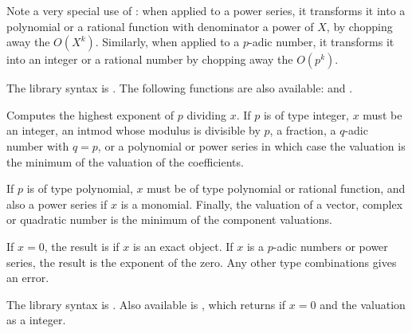 Note a very special use of : when applied to a power series, it
transforms it into a polynomial or a rational function with denominator
a power of $X$, by chopping away the $O(X^k)$. Similarly, when applied to
a $p$-adic number, it transforms it into an integer or a rational number
by chopping away the $O(p^k)$.

The library syntax is .
The following functions are also available: 
and .

\label{se:valuation}
Computes the highest
exponent of $p$ dividing $x$. If $p$ is of type integer, $x$ must be an
integer, an intmod whose modulus is divisible by $p$, a fraction, a
$q$-adic number with $q=p$, or a polynomial or power series in which case the
valuation is the minimum of the valuation of the coefficients.

If $p$ is of type polynomial, $x$ must be of type polynomial or rational
function, and also a power series if $x$ is a monomial. Finally, the
valuation of a vector, complex or quadratic number is the minimum of the
component valuations.

If $x=0$, the result is  if $x$ is an exact object. If $x$ is a
$p$-adic numbers or power series, the result is the exponent of the zero.
Any other type combinations gives an error.

The library syntax is .
Also available is
, which returns  if $x = 0$
and the valuation as a  integer.

